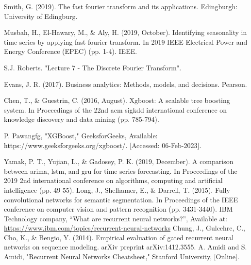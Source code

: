\documentclass{ieeeojies}
\begin{document}
\begin{thebibliography}{00}
Smith, G. (2019). The fast fourier transform and its applications. Edingburgh: University of Edingburg.




Musbah, H., El-Hawary, M., \& Aly, H. (2019, October). Identifying seasonality in time series by applying fast fourier transform. In 2019 IEEE Electrical Power and Energy Conference (EPEC) (pp. 1-4). IEEE.

S.J. Roberts. "Lecture 7 - The Discrete Fourier Transform".

Evans, J. R. (2017). Business analytics: Methods, models, and decisions. Pearson.

Chen, T., \& Guestrin, C. (2016, August). Xgboost: A scalable tree boosting system. In Proceedings of the 22nd acm sigkdd international conference on knowledge discovery and data mining (pp. 785-794).

P. Pawangfg, "XGBoost," GeeksforGeeks, Available: https://www.geeksforgeeks.org/xgboost/. [Accessed: 06-Feb-2023].

Yamak, P. T., Yujian, L., \& Gadosey, P. K. (2019, December). A comparison between arima, lstm, and gru for time series forecasting. In Proceedings of the 2019 2nd international conference on algorithms, computing and artificial intelligence (pp. 49-55).
Long, J., Shelhamer, E., \& Darrell, T. (2015). Fully convolutional networks for semantic segmentation. In Proceedings of the IEEE conference on computer vision and pattern recognition (pp. 3431-3440).
IBM Technology company, “What are recurrent neural networks?”, Available at: \url{https://www.ibm.com/topics/recurrent-neural-networks}
Chung, J., Gulcehre, C., Cho, K., \& Bengio, Y. (2014). Empirical evaluation of gated recurrent neural networks on sequence modeling. arXiv preprint arXiv:1412.3555.
A. Amidi and S. Amidi, "Recurrent Neural Networks Cheatsheet," Stanford University, [Online].



\end{thebibliography}






\EOD
\end{document}
